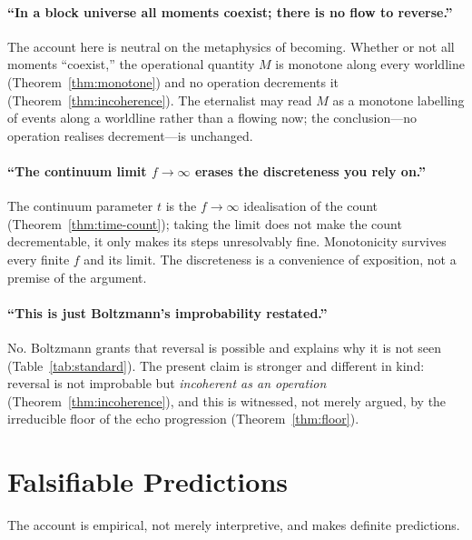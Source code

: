 \documentclass[11pt,a4paper]{article}
\theoremstyle{thmstyle}
\theoremstyle{definition}
\theoremstyle{remark}
\newcommand{\Count}{M}
\begin{document}
\paragraph{``In a block universe all moments coexist; there is no
flow to reverse.''}
The account here is neutral on the metaphysics of becoming. Whether or
not all moments ``coexist,'' the operational quantity $\Count$ is
monotone along every worldline (Theorem~\ref{thm:monotone}) and no
operation decrements it (Theorem~\ref{thm:incoherence}). The eternalist
may read $\Count$ as a monotone labelling of events along a worldline
rather than a flowing now; the conclusion---no operation realises
decrement---is unchanged.

\paragraph{``The continuum limit $f\to\infty$ erases the discreteness
you rely on.''}
The continuum parameter $t$ is the $f\to\infty$ idealisation of the count
(Theorem~\ref{thm:time-count}); taking the limit does not make the count
decrementable, it only makes its steps unresolvably fine. Monotonicity
survives every finite $f$ and its limit. The discreteness is a
convenience of exposition, not a premise of the argument.

\paragraph{``This is just Boltzmann's improbability restated.''}
No. Boltzmann grants that reversal is possible and explains why it is not
seen (Table~\ref{tab:standard}). The present claim is stronger and
different in kind: reversal is not improbable but \emph{incoherent as an
operation} (Theorem~\ref{thm:incoherence}), and this is witnessed, not
merely argued, by the irreducible floor of the echo progression
(Theorem~\ref{thm:floor}).

\section{Falsifiable Predictions}
\label{sec:predictions}

The account is empirical, not merely interpretive, and makes definite
predictions.
\end{document}
